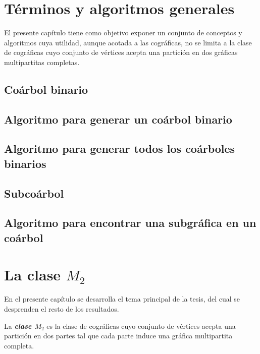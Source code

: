 

\section{Términos y algoritmos generales}
    El presente capítulo tiene como objetivo exponer un conjunto de conceptos y algoritmos cuya utilidad, aunque acotada a las cográficas, no se limita a la clase de cográficas cuyo conjunto de vértices acepta una partición en dos gráficas multipartitas completas.
    \subsection{Coárbol binario}
        
    \subsection{Algoritmo para generar un coárbol binario}
        
    \subsection{Algoritmo para generar todos los coárboles binarios}
        
    \subsection{Subcoárbol}
        
    \subsection{Algoritmo para encontrar una subgráfica en un coárbol} \label{sec_AlgoSub}
        


\section{La clase $M_2$}

    En el presente capítulo se desarrolla el tema principal de la tesis, del cual se desprenden el resto de los resultados.

    \begin{definition}
        La \textbf{\emph{clase $M_2$}} es la clase de cográficas cuyo conjunto de vértices acepta una partición en dos partes tal que cada parte induce una gráfica multipartita completa. %
    \end{definition}

